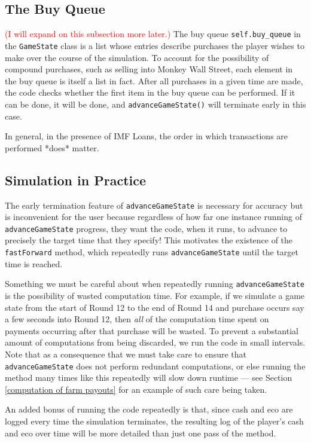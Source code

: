 \documentclass[12pt,letterpaper]{article}
\theoremstyle{remark}
\theoremstyle{plain}
\begin{document}
\subsection{The Buy Queue}

\textcolor{red}{(I will expand on this subsection more later.)} The buy queue \texttt{self.buy\_queue} in the \texttt{GameState} class is a list whose entries describe purchases the player wishes to make over the course of the simulation. To account for the possibility of compound purchases, such as selling into Monkey Wall Street, each element in the buy queue is itself a list in fact. After all purchases in a given time are made, the code checks whether the first item in the buy queue can be performed. If it can be done, it will be done, and \texttt{advanceGameState()} will terminate early in this case.

In general, in the presence of IMF Loans, the order in which transactions are performed *does* matter.

\subsection{Simulation in Practice}

The early termination feature of \texttt{advanceGameState} is necessary for accuracy but is inconvenient for the user because regardless of how far one instance running of \texttt{advanceGameState} progress, they want the code, when it runs, to advance to precisely the target time that they specify!  This motivates the existence of the \texttt{fastForward} method, which repeatedly runs \texttt{advanceGameState} until the target time is reached.

Something we must be careful about when repeatedly running \texttt{advanceGameState} is the possibility of wasted computation time. For example, if we simulate a game state from the start of Round 12 to the end of Round 14 and purchase occurs say a few seconds into Round 12, then \textit{all} of the computation time spent on payments occurring after that purchase will be wasted. To prevent a substantial amount of computations from being discarded, we run the code in small intervals. Note that as a consequence that we must take care to ensure that \texttt{advanceGameState} does not perform redundant computations, or else running the method many times like this repeatedly will slow down runtime --- see Section \ref{computation of farm payouts} for an example of such care being taken.

An added bonus of running the code repeatedly is that, since cash and eco are logged every time the simulation terminates, the resulting log of the player's cash and eco over time will be more detailed than just one pass of the method.
\end{document}

